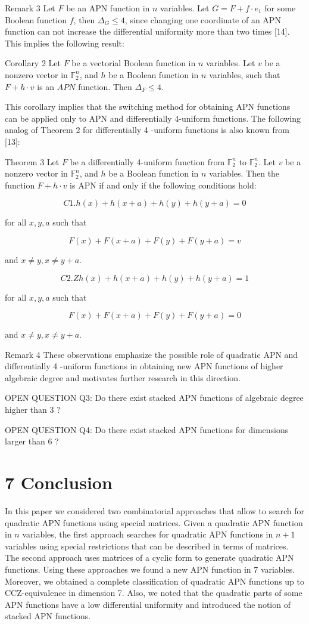 \documentclass[10pt]{article}
\begin{document}
Remark 3 Let $F$ be an APN function in $n$ variables. Let $G=F+f \cdot e_{1}$ for some Boolean function $f$, then $\Delta_{G} \leqslant 4$, since changing one coordinate of an APN function can not increase the differential uniformity more than two times [14]. This implies the following result:

Corollary 2 Let $F$ be a vectorial Boolean function in $n$ variables. Let $v$ be a nonzero vector in $\mathbb{F}_{2}^{n}$, and $h$ be a Boolean function in $n$ variables, such that $F+h \cdot v$ is an $A P N$ function. Then $\Delta_{F} \leqslant 4$.

This corollary implies that the switching method for obtaining APN functions can be applied only to APN and differentially 4-uniform functions. The following analog of Theorem 2 for differentially 4 -uniform functions is also known from [13]:

Theorem 3 Let $F$ be a differentially 4-uniform function from $\mathbb{F}_{2}^{n}$ to $\mathbb{F}_{2}^{n}$. Let $v$ be a nonzero vector in $\mathbb{F}_{2}^{n}$, and $h$ be a Boolean function in $n$ variables. Then the function $F+h \cdot v$ is APN if and only if the following conditions hold:

$$
C 1 . h(x)+h(x+a)+h(y)+h(y+a)=0
$$

for all $x, y, a$ such that

$$
F(x)+F(x+a)+F(y)+F(y+a)=v
$$

and $x \neq y, x \neq y+a$.

$$
C 2 . Z h(x)+h(x+a)+h(y)+h(y+a)=1
$$

for all $x, y, a$ such that

$$
F(x)+F(x+a)+F(y)+F(y+a)=0
$$

and $x \neq y, x \neq y+a$.

Remark 4 These observations emphasize the possible role of quadratic APN and differentially 4 -uniform functions in obtaining new APN functions of higher algebraic degree and motivates further research in this direction.

OPEN QUESTION Q3: Do there exist stacked APN functions of algebraic degree higher than 3 ?

OPEN QUESTION Q4: Do there exist stacked APN functions for dimensions larger than 6 ?

\section*{7 Conclusion}
In this paper we considered two combinatorial approaches that allow to search for quadratic APN functions using special matrices. Given a quadratic APN function in $n$ variables, the first approach searches for quadratic APN functions in $n+1$ variables using special restrictions that can be described in terms of matrices. The second approach uses matrices of a cyclic form to generate quadratic APN functions. Using these approaches we found a new APN function in 7 variables. Moreover, we obtained a complete classification of quadratic APN functions up to CCZ-equivalence in dimension 7. Also, we noted that the quadratic parts of some APN functions have a low differential uniformity and introduced the notion of stacked APN functions.
\end{document}
